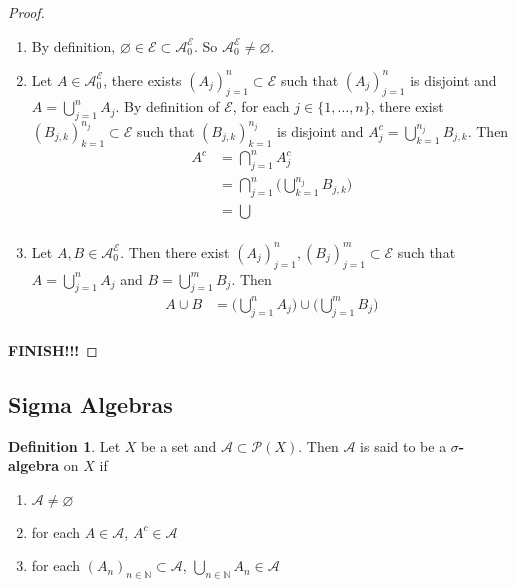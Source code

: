 \documentclass[12pt]{amsart}
\theoremstyle{definition}
\newtheorem{defn}[definition]{Definition}
\newcommand{\N}{\mathbb{N}}
\newcommand{\MA}{\mathcal{A}}
\newcommand{\MP}{\mathcal{P}}
\newcommand{\ME}{\mathcal{E}}
\newcommand{\ld}[1]{\label{defn:#1}}
\begin{document}
	\begin{proof}\
		\begin{enumerate}
			\item By definition, $\varnothing \in \ME \subset \MA^{\ME}_0$. So $\MA^{\ME}_0 \neq \varnothing$. 
			\item Let $A \in \MA^{\ME}_0$, there exists $(A_j)_{j=1}^n \subset \ME$ such that $(A_j)_{j=1}^n$ is disjoint and $A = \bigcup\limits_{j =1}^n A_j$. By definition of $\ME$, for each $j \in \{1, \ldots, n\}$, there exist $(B_{j,k})_{k=1}^{n_j} \subset \ME$ such that $(B_{j,k})_{k=1}^{n_j}$ is disjoint and $A_j^c = \bigcup\limits_{k=1}^{n_j}B_{j,k}$. Then 
			\begin{align*}
				A^c 
				&= \bigcap_{j=1}^n A_j^c \\
				&= \bigcap_{j=1}^n \bigg( \bigcup\limits_{k=1}^{n_j}B_{j,k} \bigg)\\
				&= \bigcup\\
			\end{align*}	 
			\item Let $A, B \in \MA^{\ME}_0$. Then there exist $(A_j)_{j=1}^n, (B_j)_{j=1}^m \subset \ME$ such that $A = \bigcup\limits_{j=1}^n A_j$ and  $B = \bigcup\limits_{j=1}^m B_j$. Then 
			\begin{align*}
				A \cup B 
				&=  \bigg( \bigcup\limits_{j=1}^n A_j \bigg) \cup \bigg( \bigcup\limits_{j=1}^m B_j \bigg) \\
			\end{align*}
		\end{enumerate}
		\textbf{FINISH!!!}
	\end{proof}

	
























	\newpage
	\subsection{Sigma Algebras}
		
	\begin{defn} \ld{00000} 
		Let $X$ be a set and $\MA \subset \MP(X)$. Then $\MA$ is said to be a $\sigma$\textbf{-algebra} on $X$ if 
		\begin{enumerate}
			\item $\MA \neq \varnothing$
			\item for each $A \in \MA$, $A^c \in \MA$
			\item for each $(A_n)_{n \in \N} \subset \MA$, $\bigcup\limits_{n \in \N}A_n \in \MA$
		\end{enumerate}
	\end{defn}
	
\end{document}
